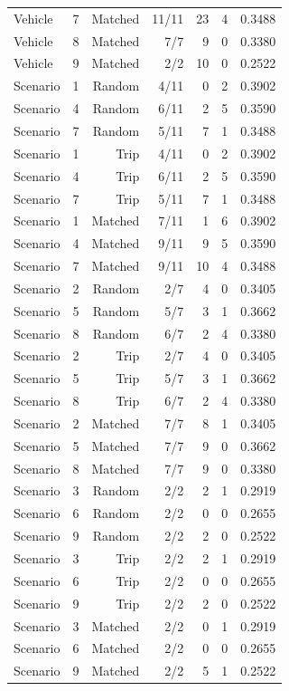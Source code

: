 \begin{singlespace}
\begin{longtable}{llrrrrr}
Vehicle & 7 & Matched & 11/11 & 23 & 4 & 0.3488 \\
Vehicle & 8 & Matched & 7/7 & 9 & 0 & 0.3380 \\
Vehicle & 9 & Matched & 2/2 & 10 & 0 & 0.2522 \\
Scenario & 1 & Random & 4/11 & 0 & 2 & 0.3902 \\
Scenario & 4 & Random & 6/11 & 2 & 5 & 0.3590 \\
Scenario & 7 & Random & 5/11 & 7 & 1 & 0.3488 \\
Scenario & 1 & Trip & 4/11 & 0 & 2 & 0.3902 \\
Scenario & 4 & Trip & 6/11 & 2 & 5 & 0.3590 \\
Scenario & 7 & Trip & 5/11 & 7 & 1 & 0.3488 \\
Scenario & 1 & Matched & 7/11 & 1 & 6 & 0.3902 \\
Scenario & 4 & Matched & 9/11 & 9 & 5 & 0.3590 \\
Scenario & 7 & Matched & 9/11 & 10 & 4 & 0.3488 \\
Scenario & 2 & Random & 2/7 & 4 & 0 & 0.3405 \\
Scenario & 5 & Random & 5/7 & 3 & 1 & 0.3662 \\
Scenario & 8 & Random & 6/7 & 2 & 4 & 0.3380 \\
Scenario & 2 & Trip & 2/7 & 4 & 0 & 0.3405 \\
Scenario & 5 & Trip & 5/7 & 3 & 1 & 0.3662 \\
Scenario & 8 & Trip & 6/7 & 2 & 4 & 0.3380 \\
Scenario & 2 & Matched & 7/7 & 8 & 1 & 0.3405 \\
Scenario & 5 & Matched & 7/7 & 9 & 0 & 0.3662 \\
Scenario & 8 & Matched & 7/7 & 9 & 0 & 0.3380 \\
Scenario & 3 & Random & 2/2 & 2 & 1 & 0.2919 \\
Scenario & 6 & Random & 2/2 & 0 & 0 & 0.2655 \\
Scenario & 9 & Random & 2/2 & 2 & 0 & 0.2522 \\
Scenario & 3 & Trip & 2/2 & 2 & 1 & 0.2919 \\
Scenario & 6 & Trip & 2/2 & 0 & 0 & 0.2655 \\
Scenario & 9 & Trip & 2/2 & 2 & 0 & 0.2522 \\
Scenario & 3 & Matched & 2/2 & 0 & 1 & 0.2919 \\
Scenario & 6 & Matched & 2/2 & 0 & 0 & 0.2655 \\
Scenario & 9 & Matched & 2/2 & 5 & 1 & 0.2522 \\
\bottomrule
\end{longtable}
\end{singlespace}
